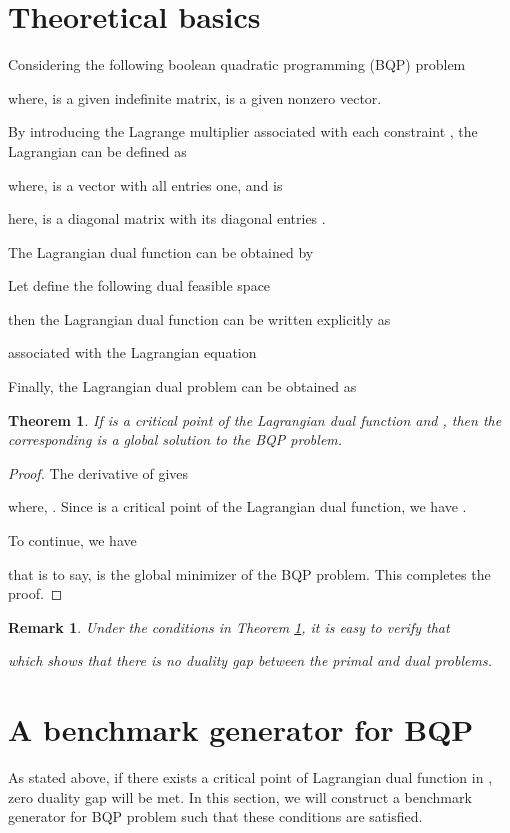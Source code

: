 \documentclass[conference]{IEEEtran}
\newtheorem{theorem}{Theorem}
\newtheorem{remark}{Remark}
\begin{document}
\section{Theoretical basics}
Considering the following boolean quadratic programming (BQP) problem

where,  is a given indefinite matrix,  is a given nonzero vector.

By introducing the Lagrange multiplier  associated with each constraint , the Lagrangian  can be defined as

where,  is a vector with all entries one, and  is

here,  is a diagonal matrix with its diagonal entries .

The Lagrangian dual function can be obtained by


Let define the following dual feasible space

then the Lagrangian dual function can be written explicitly as

associated with the Lagrangian equation


Finally, the Lagrangian dual problem can be obtained as


\begin{theorem}\label{the1}
If  is a critical point of the Lagrangian dual function and , then the corresponding
 is a global solution to the BQP problem.
\end{theorem}
\begin{proof}
The derivative of  gives

where, . Since  is a critical point of the Lagrangian dual function, we have .

To continue, we have

that is to say,  is the global minimizer of the BQP problem.
This completes the proof.
\end{proof}
\begin{remark}
Under the conditions in Theorem \ref{the1}, it is easy to verify that

which shows that there is no duality gap between the primal and dual problems.
\end{remark}

\section{A benchmark generator for BQP}
As stated above, if there exists a critical point of Lagrangian dual function in , zero duality gap will be met.
In this section, we will construct a benchmark generator for BQP problem such that these conditions are satisfied.
\end{document}
